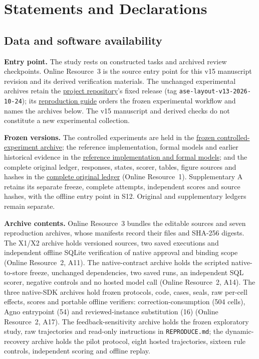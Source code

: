 \documentclass[pdflatex,sn-basic]{sn-jnl}
\begin{document}
\section*{Statements and Declarations}
\subsection*{Data and software availability}
\textbf{Entry point.} The study rests on constructed tasks and archived review checkpoints. Online Resource~3 is the source entry point for this v15 manuscript revision and its derived verification materials. The unchanged experimental archives retain the \href{https://github.com/lhh666-6/auto-dete}{project repository}'s fixed release (tag \texttt{ase-layout-v13-2026-10-24}); its \href{https://github.com/lhh666-6/auto-dete/blob/ase-layout-v13-2026-10-24/REPRODUCIBILITY.md}{reproduction guide} orders the frozen experimental workflow and names the archives below. The v15 manuscript and derived checks do not constitute a new experimental collection.

\textbf{Frozen versions.} The controlled experiments are held in the \href{https://github.com/lhh666-6/auto-dete/tree/2645e5e18c900ea91c9c980e44195dc71e410432/DKE-supplement}{frozen controlled-experiment archive}; the reference implementation, formal models and earlier historical evidence in the \href{https://github.com/lhh666-6/auto-dete/tree/c6d512843c905cab6d8521dd8c914f7fb26d85ae/latest}{reference implementation and formal models}; and the complete original ledger, responses, states, scorer, tables, figure sources and hashes in the \href{https://github.com/lhh666-6/auto-dete/tree/475e66f549613aaaaa62c2ec81ffdee483636c54/cloud-handoff}{complete original ledger} (Online Resource~1). Supplementary A retains its separate freeze, complete attempts, independent scores and source hashes, with the offline entry point in S12. Original and supplementary ledgers remain separate.

\textbf{Archive contents.} Online Resource~3 bundles the editable sources and seven reproduction archives, whose manifests record their files and SHA-256 digests. The X1/X2 archive holds versioned sources, two saved executions and independent offline SQLite verification of native approval and binding scope (Online Resource~2, A11). The native-contract archive holds the scripted native-to-store freeze, unchanged dependencies, two saved runs, an independent SQL scorer, negative controls and no hosted model call (Online Resource~2, A14). The three native-{SDK} archives hold frozen protocols, code, cases, seals, raw per-cell effects, scores and portable offline verifiers: correction-consumption (504 cells), Agno entrypoint (54) and reviewed-instance substitution (16) (Online Resource~2, A17). The feedback-sensitivity archive holds the frozen exploratory study, raw trajectories and read-only instructions in \nolinkurl{REPRODUCE.md}; the dynamic-recovery archive holds the pilot protocol, eight hosted trajectories, sixteen rule controls, independent scoring and offline replay.
\end{document}
